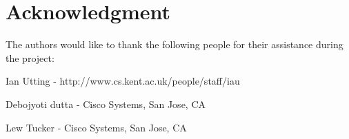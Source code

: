 \documentclass[10pt, a4paper, conference, compsocconf]{IEEEtran}
\begin{document}





\section*{Acknowledgment}
The authors would like to thank the following people for their assistance during
the project:

Ian Utting - http://www.cs.kent.ac.uk/people/staff/iau

Debojyoti dutta - Cisco Systems, San Jose, CA

Lew Tucker - Cisco Systems, San Jose, CA


\end{document}
